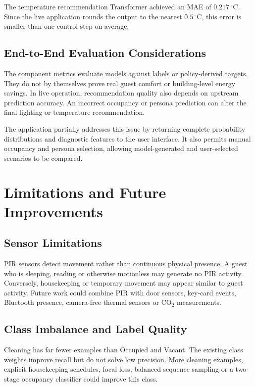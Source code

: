 The temperature recommendation Transformer achieved an MAE of
$0.217\,^{\circ}\mathrm{C}$. Since the live application rounds the output to
the nearest $0.5\,^{\circ}\mathrm{C}$, this error is smaller than one control
step on average.

\section{End-to-End Evaluation Considerations}

The component metrics evaluate models against labels or policy-derived targets.
They do not by themselves prove real guest comfort or building-level energy
savings. In live operation, recommendation quality also depends on upstream
prediction accuracy. An incorrect occupancy or persona prediction can alter
the final lighting or temperature recommendation.

The application partially addresses this issue by returning complete
probability distributions and diagnostic features to the user interface. It
also permits manual occupancy and persona selection, allowing model-generated
and user-selected scenarios to be compared.


\chapter{Limitations and Future Improvements}
\label{chap:limitations}

\section{Sensor Limitations}

PIR sensors detect movement rather than continuous physical presence. A guest
who is sleeping, reading or otherwise motionless may generate no PIR activity.
Conversely, housekeeping or temporary movement may appear similar to guest
activity. Future work could combine PIR with door sensors, key-card events,
Bluetooth presence, camera-free thermal sensors or CO$_2$ measurements.

\section{Class Imbalance and Label Quality}

Cleaning has far fewer examples than Occupied and Vacant. The existing class
weights improve recall but do not solve low precision. More cleaning examples,
explicit housekeeping schedules, focal loss, balanced sequence sampling or a
two-stage occupancy classifier could improve this class.

